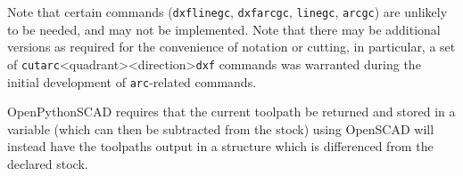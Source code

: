 \documentclass{ltxdoc}
\begin{document}
\bigskip

\noindent Note that certain commands (\verb|dxflinegc|, \verb|dxfarcgc|, \verb|linegc|, \verb|arcgc|) are unlikely to be needed, and may not be implemented. Note that there may be additional versions as required for the convenience of notation or cutting, in particular, a set of \verb|cutarc|<quadrant><direction>\verb|dxf| commands was warranted during the initial development of \verb|arc|-related commands.

OpenPythonSCAD requires that the current toolpath be returned and stored in a variable (which can then be subtracted from the stock) using OpenSCAD will instead have the toolpaths output in a structure which is differenced from the declared stock.

\addvspace{\baselineskip}

%
%
%
%
%
%
%
%
%

\end{document}
